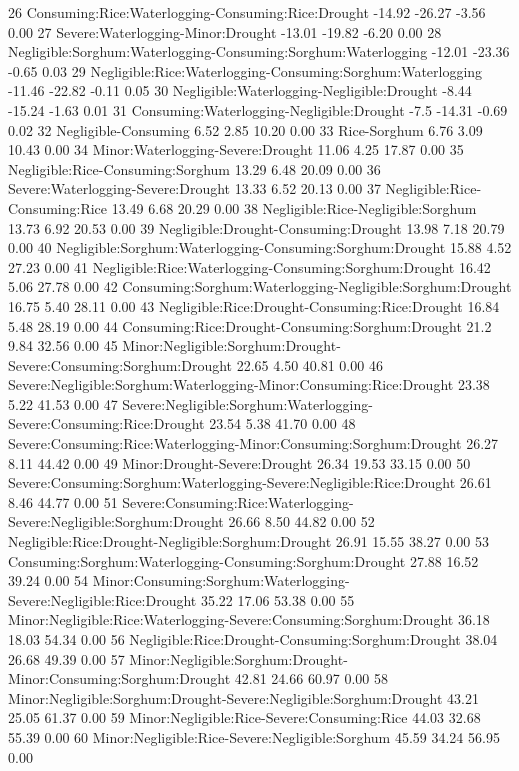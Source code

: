 \documentclass[12pt,oneside]{article}
\begin{document}
26 Consuming:Rice:Waterlogging-Consuming:Rice:Drought -14.92 -26.27 -3.56 0.00
27 Severe:Waterlogging-Minor:Drought -13.01 -19.82 -6.20 0.00
28 Negligible:Sorghum:Waterlogging-Consuming:Sorghum:Waterlogging -12.01 -23.36 -0.65 0.03
29 Negligible:Rice:Waterlogging-Consuming:Sorghum:Waterlogging -11.46 -22.82 -0.11 0.05
30 Negligible:Waterlogging-Negligible:Drought -8.44 -15.24 -1.63 0.01
31 Consuming:Waterlogging-Negligible:Drought -7.5 -14.31 -0.69 0.02
32 Negligible-Consuming 6.52 2.85 10.20 0.00
33 Rice-Sorghum 6.76 3.09 10.43 0.00
34 Minor:Waterlogging-Severe:Drought 11.06 4.25 17.87 0.00
35 Negligible:Rice-Consuming:Sorghum 13.29 6.48 20.09 0.00
36 Severe:Waterlogging-Severe:Drought 13.33 6.52 20.13 0.00
37 Negligible:Rice-Consuming:Rice 13.49 6.68 20.29 0.00
38 Negligible:Rice-Negligible:Sorghum 13.73 6.92 20.53 0.00
39 Negligible:Drought-Consuming:Drought 13.98 7.18 20.79 0.00
40 Negligible:Sorghum:Waterlogging-Consuming:Sorghum:Drought 15.88 4.52 27.23 0.00
41 Negligible:Rice:Waterlogging-Consuming:Sorghum:Drought 16.42 5.06 27.78 0.00
42 Consuming:Sorghum:Waterlogging-Negligible:Sorghum:Drought 16.75 5.40 28.11 0.00
43 Negligible:Rice:Drought-Consuming:Rice:Drought 16.84 5.48 28.19 0.00
44 Consuming:Rice:Drought-Consuming:Sorghum:Drought 21.2 9.84 32.56 0.00
45 Minor:Negligible:Sorghum:Drought-Severe:Consuming:Sorghum:Drought 22.65 4.50 40.81 0.00
46 Severe:Negligible:Sorghum:Waterlogging-Minor:Consuming:Rice:Drought 23.38 5.22 41.53 0.00
47 Severe:Negligible:Sorghum:Waterlogging-Severe:Consuming:Rice:Drought 23.54 5.38 41.70 0.00
48 Severe:Consuming:Rice:Waterlogging-Minor:Consuming:Sorghum:Drought 26.27 8.11 44.42 0.00
49 Minor:Drought-Severe:Drought 26.34 19.53 33.15 0.00
50 Severe:Consuming:Sorghum:Waterlogging-Severe:Negligible:Rice:Drought 26.61 8.46 44.77 0.00
51 Severe:Consuming:Rice:Waterlogging-Severe:Negligible:Sorghum:Drought 26.66 8.50 44.82 0.00
52 Negligible:Rice:Drought-Negligible:Sorghum:Drought 26.91 15.55 38.27 0.00
53 Consuming:Sorghum:Waterlogging-Consuming:Sorghum:Drought 27.88 16.52 39.24 0.00
54 Minor:Consuming:Sorghum:Waterlogging-Severe:Negligible:Rice:Drought 35.22 17.06 53.38 0.00
55 Minor:Negligible:Rice:Waterlogging-Severe:Consuming:Sorghum:Drought 36.18 18.03 54.34 0.00
56 Negligible:Rice:Drought-Consuming:Sorghum:Drought 38.04 26.68 49.39 0.00
57 Minor:Negligible:Sorghum:Drought-Minor:Consuming:Sorghum:Drought 42.81 24.66 60.97 0.00
58 Minor:Negligible:Sorghum:Drought-Severe:Negligible:Sorghum:Drought 43.21 25.05 61.37 0.00
59 Minor:Negligible:Rice-Severe:Consuming:Rice 44.03 32.68 55.39 0.00
60 Minor:Negligible:Rice-Severe:Negligible:Sorghum 45.59 34.24 56.95 0.00
\end{document}
